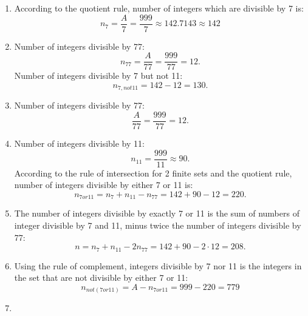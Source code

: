\documentclass[a4paper]{article}
\begin{document}
\begin{enumerate}[label = \textbf{\alph*)}]
	\item According to the quotient rule, number of integers which are divisible by 7 is:
	      \begin{equation*}
		      n_7 = \frac{A}{7} = \frac{999}{7} \approx 142.7143 \approx 142
	      \end{equation*}
	\item Number of integers divisible by 77:
	      \begin{equation*}
		      n_{77} = \frac{A}{77} = \frac{999}{77} = 12. 
	      \end{equation*}
	      Number of integers divisible by 7 but not 11:
	      \begin{equation*}
		      n_{7,not 11} = 142 - 12 = 130.
	      \end{equation*}
	\item Number of integers divisible by 77:
	      \begin{equation*}
		      \frac{A}{77} = \frac{999}{77} = 12. 
	      \end{equation*}
	\item Number of integers divisible by 11:
	      \begin{equation*}
		      n_{11} = \frac{999}{11} \approx 90.
	      \end{equation*}
	      According to the rule of intersection for 2 finite sets and the quotient rule, number of integers divisible by either 7 or 11 is:
	      \begin{equation*}
		      n_{7 or 11} = n_7 +n_{11} - n_{77} = 142 + 90 - 12 = 220. 
	      \end{equation*}
	\item The number of integers divisible by exactly 7 or 11 is the sum of numbers of integer divisible by 7 and 11, minus twice the number of integers divisible by 77:
	      \begin{equation*}
		      n = n_7 + n_{11} - 2n_{77} = 142 + 90 - 2\cdot 12 = 208.
	      \end{equation*}
	\item Using the rule of complement, integers divisible by 7 nor 11 is the integers in the set that are not divisible by either 7 or 11:
	      \begin{equation*}
		      n_{not(7 or 11)} = A - n_{7 or 11} = 999 - 220 = 779
	      \end{equation*}
	\item 
	      \begin{itemize}

\end{itemize}
\end{enumerate}
\end{document}
